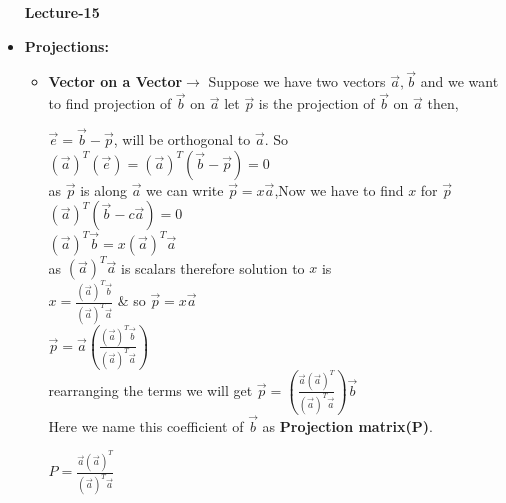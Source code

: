 \documentclass[a4paper,11pt]{article}
\numberwithin{equation}{section}
\begin{document}
\begin{itemize}
\begin{center}
    \Huge{\textbf{Lecture-15}}
\end{center}
\vspace{5pt}

\item \textbf{Projections: }
\begin{itemize}
    \item \textbf{Vector on a Vector$\rightarrow$} Suppose we have two vectors $\vec{a},\vec{b}$ and we want to find projection of $\vec{b}$ on $\vec{a}$ let $\vec{p}$ is the projection of $\vec{b}$ on $\vec{a}$ then,
    \begin{center}
    $\vec{e}=\vec{b}-\vec{p}$, will be orthogonal to $\vec{a}$. So\\
    \vspace{5pt}
    $(\vec{a})^T(\vec{e})=(\vec{a})^T(\vec{b}-\vec{p})=0$\\
    \vspace{5pt}
    as $\vec{p}$ is along $\vec{a}$ we can write $\vec{p}=x\vec{a}$,Now we have to find $x$ for $\vec{p}$\\
    \vspace{5pt}
    $(\vec{a})^T(\vec{b}-c\vec{a})=0$\\ \vspace{5pt}
    $(\vec{a})^T\vec{b}=x(\vec{a})^T\vec{a}$\\ \vspace{5pt}
    as $(\vec{a})^T\vec{a}$ is scalars therefore solution to $x$ is\\
    \vspace{5pt}
    $x=\frac{(\vec{a})^T\vec{b}}{(\vec{a})^T\vec{a}}$ \hspace{5pt}\& so $\vec{p}=x\vec{a}$\\ \vspace{7pt}
    $\vec{p}=\vec{a}\left(\frac{(\vec{a})^T\vec{b}}{(\vec{a})^T\vec{a}} \right) $\\ \vspace{7pt}
    rearranging the terms we will get
    $\vec{p}=\left(\frac{\vec{a}(\vec{a})^T}{(\vec{a})^T\vec{a}} \right) \vec{b}$\\ \vspace{7pt}
    Here we name this coefficient of $\vec{b}$ as \textbf{Projection matrix(P)}.\\ \vspace{7pt}

    $P=\frac{\vec{a}(\vec{a})^T}{(\vec{a})^T\vec{a}}$\\ \vspace{7pt}


\end{center}
\end{itemize}
\end{itemize}
\end{document}
